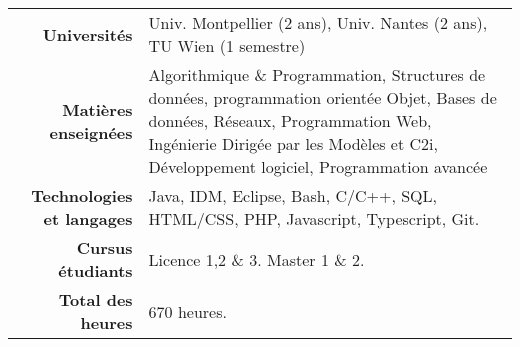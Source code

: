 
\begin{tabular}{r @{~$\rangle$~} p{}}

\textbf{Universités} & Univ. Montpellier (2 ans), Univ. Nantes (2 ans), TU Wien (1 semestre) \\

\textbf{Matières enseignées} & Algorithmique \& Programmation, Structures de données, programmation orientée Objet, Bases de données, Réseaux, Programmation Web, Ingénierie Dirigée par les Modèles et C2i, Développement logiciel, Programmation avancée  \\

\textbf{Technologies et langages} & Java, IDM, Eclipse, Bash, C/C++, SQL, HTML/CSS, PHP, Javascript, Typescript, Git.\\

\textbf{Cursus étudiants} & Licence 1,2 \& 3. Master 1 \& 2. \\

\textbf{Total des heures} & $670$ heures. \\
\end{tabular}
